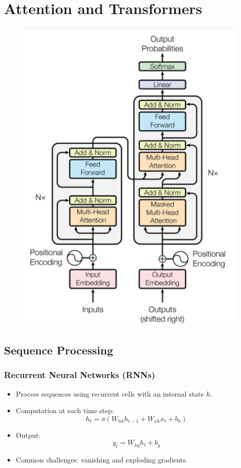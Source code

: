 \section{Attention and Transformers}
\begin{figure}[ht]
    \includegraphics[width=0.6\columnwidth]{figures/AttentionTransformer/Transformer.png}
\end{figure}
\subsection{Sequence Processing}
\subsubsection{Recurrent Neural Networks (RNNs)}
\begin{itemize}
    \item Process sequences using recurrent cells with an internal state \( h \).
    \item Computation at each time step:
    \[
    h_t = \sigma(W_{hh} h_{t-1} + W_{xh} x_t + b_h)
    \]
    \item Output:
    \[
    y_t = W_{hy} h_t + b_y
    \]
    \item Common challenges: vanishing and exploding gradients.
\end{itemize}

